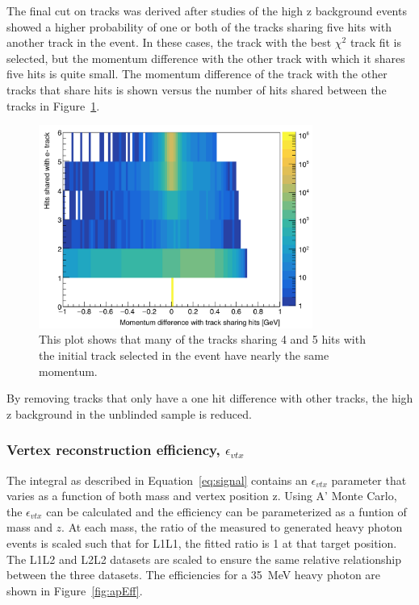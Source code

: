 \documentclass[twoside]{article}
\begin{document}
The final cut on tracks was derived after studies of the high z background events showed a higher probability of one or both of the tracks sharing five hits with another track in the event. In these cases, the track with the best $\chi^2$ track fit is selected, but the momentum difference with the other track with which it shares five hits is quite small. The momentum difference of the track with the other tracks that share hits is shown versus the number of hits shared between the tracks in Figure~\ref{fig:trkshare}.

\begin{figure}[H]
  \centering
      \includegraphics[width=0.8\textwidth]{plots/TrkShareHits.png}
  \caption{This plot shows that many of the tracks sharing 4 and 5 hits with the initial track selected in the event have nearly the same momentum.}
  \label{fig:trkshare}
\end{figure} 

By removing tracks that only have a one hit difference with other tracks, the high z background in the unblinded sample is reduced.   


\subsubsection{Vertex reconstruction efficiency, $\epsilon_{vtx}$}

The integral as described in Equation~\eqref{eq:signal} contains an $\epsilon_{vtx}$ parameter that varies as a function of both mass and vertex position z. Using A' Monte Carlo, the $\epsilon_{vtx}$ can be calculated and the efficiency can be parameterized as a funtion of mass and $z$. At each mass, the ratio of the measured to generated heavy photon events is scaled such that for L1L1, the fitted ratio is 1 at that target position. The L1L2 and L2L2 datasets are scaled to ensure the same relative relationship between the three datasets. The efficiencies for a 35~MeV heavy photon are shown in Figure~\ref{fig:apEff}. 
\end{document}
